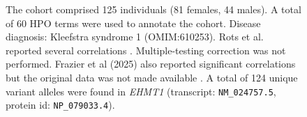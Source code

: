 \begin{figure}[htbp]
\vspace{2em}

\caption{ The cohort comprised 125 individuals (81 females, 44 males). A total of 60 HPO terms were used to annotate the cohort. Disease diagnosis: Kleefstra syndrome 1 (OMIM:610253). 
Rots et al. reported several correlations \cite{PMID_39013458}. Multiple-testing correction was not performed. Frazier et al (2025) also reported significant correlations but the original data was not made available \cite{PMID_39746677}.  A total of 124 unique variant alleles were found in \textit{EHMT1} (transcript: \texttt{NM\_024757.5}, protein id: \texttt{NP\_079033.4}).}
\end{figure}
